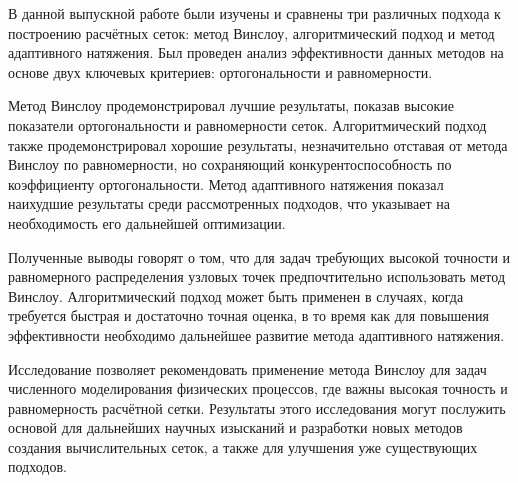 \documentclass[a4paper,14pt,russian]{extreport}
\renewcommand{\_}{\kern-1.5pt\textunderscore\kern-1.5pt}
\begin{document}
\par В данной выпускной работе были изучены и сравнены три различных подхода к построению расчётных сеток: метод Винслоу, алгоритмический подход и метод адаптивного натяжения. Был проведен анализ эффективности данных методов на основе двух ключевых критериев: ортогональности и равномерности.

\par Метод Винслоу продемонстрировал лучшие результаты, показав высокие показатели ортогональности и равномерности сеток. Алгоритмический подход также продемонстрировал хорошие результаты, незначительно отставая от метода Винслоу по равномерности, но сохраняющий конкурентоспособность по коэффициенту ортогональности. Метод адаптивного натяжения показал наихудшие результаты среди рассмотренных подходов, что указывает на необходимость его дальнейшей оптимизации.

\par Полученные выводы говорят о том, что для задач требующих высокой точности и равномерного распределения узловых точек предпочтительно использовать метод Винслоу. Алгоритмический подход может быть применен в случаях, когда требуется быстрая и достаточно точная оценка, в то время как для повышения эффективности необходимо дальнейшее развитие метода адаптивного натяжения.

\par Исследование позволяет рекомендовать применение метода Винслоу для задач численного моделирования физических процессов, где важны высокая точность и равномерность расчётной сетки.
Результаты этого исследования могут послужить основой для дальнейших научных изысканий и разработки новых методов создания вычислительных сеток, а также для улучшения уже существующих подходов.
\end{document}
